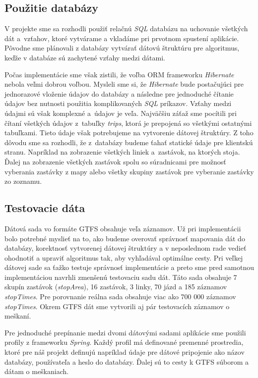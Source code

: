 \subsection{Použitie databázy}
V projekte sme sa rozhodli použiť relačnú \textit{SQL} databázu na uchovanie všetkých dát a~vzťahov, ktoré vytvárame a vkladáme pri prvotnom spustení aplikácie. Pôvodne sme plánovali z databázy vytvárať dátovú štruktúru pre algoritmus, keďže v databáze sú zachytené vzťahy medzi dátami.

Počas implementácie sme však zistili, že voľba ORM frameworku \textit{Hibernate} nebola veľmi dobrou voľbou. Mysleli sme si, že \textit{Hibernate} bude postačujúci pre jednorazové vloženie údajov do databázy a následne pre jednoduché čítanie údajov bez nutnosti použitia komplikovaných \textit{SQL} príkazov. Vzťahy medzi údajmi sú však komplexné a~údajov je veľa. Najväčšiu záťaž sme pocítili pri čítaní všetkých údajov z~tabuľky \textit{trips}, ktorá je prepojená so všetkými ostatnými tabuľkami. Tieto údaje však potrebujeme na vytvorenie dátovej štruktúry. Z toho dôvodu sme sa rozhodli, že z~databázy budeme ťahať statické údaje pre klientskú stranu. Napríklad na zobrazenie všetkých liniek a~zastávok, na ktorých stoja. Ďalej na zobrazenie všetkých zastávok spolu so súradnicami pre možnosť vyberania zastávky z mapy alebo všetky skupiny zastávok pre vyberanie zastávky zo zoznamu.

\subsection{Testovacie dáta}
\label{sec:test-data}
Dátová sada vo formáte GTFS obsahuje veľa záznamov. Už pri implementácii bolo potrebné myslieť na to, ako budeme overovať správnosť mapovania dát do databázy, korektnosť vytvorenej dátovej štruktúry a v neposlednom rade vedieť ohodnotiť a upraviť algoritmus tak, aby vyhľadával optimálne cesty. Pri veľkej dátovej sade sa ťažko testuje správnosť implementácie a preto sme pred samotnou implementáciou navrhli zmenšenú testovaciu sadu dát. 
Táto sada obsahuje 7 skupín zastávok (\textit{stopArea}), 16 zastávok, 3 linky, 70 jázd a 185 záznamov \textit{stopTimes}. Pre porovnanie reálna sada obsahuje viac ako 700 000 záznamov \textit{stopTimes}. Okrem GTFS dát sme vytvorili aj pár testovacích záznamov o meškaní. 

Pre jednoduché prepínanie medzi dvomi dátovými sadami aplikácie sme použili profily z frameworku \textit{Spring}. Každý profil má definované premenné prostredia, ktoré pre náš projekt definujú napríklad údaje pre dátové pripojenie ako názov databázy, používateľa a heslo do databázy. Ďalej sú to cesty k GTFS súborom a dátam o meškaniach. 

